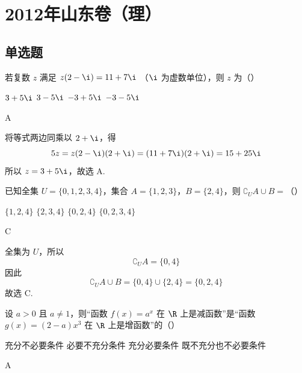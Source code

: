 \chapter{2012年山东卷（理）}

\section{单选题}

\begin{problem}
若复数 \(z\) 满足 \(z(2 - \i) = 11 + 7\i\) （\(\i\) 为虚数单位），则 \(z\) 为（\quad）

\choices
    {\(3 + 5\i\)}
    {\(3 - 5\i\)}
    {\(-3 + 5\i\)}
    {\(-3 - 5\i\)}
\end{problem}

\begin{answer}
A
\end{answer}

\begin{solution}
将等式两边同乘以 \(2+\i\)，得
\[
5z=z(2-\i)(2+\i)=(11+7\i)(2+\i)=15+25\i
\]
所以 \(z=3+5\i\)，故选 A.
\end{solution}

\begin{problem}
已知全集 \(U = \{0, 1, 2, 3, 4\}\)，集合 \(A = \{1, 2, 3\}\)，\(B = \{2, 4\}\)，则 \(\complement_U A \cup B =\)（\quad）

\choices
    {\(\{1, 2, 4\}\)}
    {\(\{2, 3, 4\}\)}
    {\(\{0, 2, 4\}\)}
    {\(\{0, 2, 3, 4\}\)}
\end{problem}

\begin{answer}
C
\end{answer}

\begin{solution}
全集为 \(U\)，所以
\[
\complement_U A=\{0,4\}
\]
因此
\[
\complement_U A\cup B=\{0,4\}\cup\{2,4\}=\{0,2,4\}
\]
故选 C.
\end{solution}

\begin{problem}
设 \(a > 0\) 且 \(a \neq 1\)，则“函数 \(f(x) = a^x\) 在 \(\R\) 上是减函数”是“函数 \(g(x) = (2 - a)x^3\) 在 \(\R\) 上是增函数”的（\quad）

\choices
    {充分不必要条件}
    {必要不充分条件}
    {充分必要条件}
    {既不充分也不必要条件}
\end{problem}

\begin{answer}
A
\end{answer}

